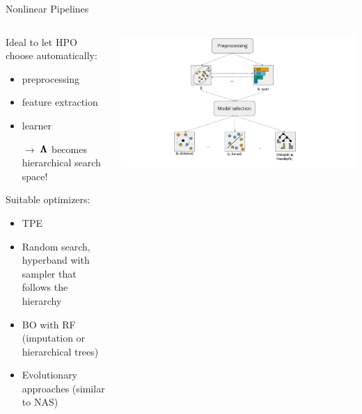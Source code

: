 	\begin{frame}{Nonlinear Pipelines}
		
		\begin{columns}
			\begin{column}{0.6\textwidth}
				Ideal to let HPO choose automatically:
				\begin{itemize}
					\item preprocessing
					\item feature extraction   
					\item learner
					\item[$\rightarrow$] $\pmb{\Lambda}$ becomes hierarchical search space!
				\end{itemize}
				
				\vspace*{0.5em}
				
				Suitable optimizers:
				\begin{itemize}
					\item TPE 
					\item Random search, hyperband with sampler that follows the hierarchy
					\item BO with RF (imputation or hierarchical trees) 
					\item Evolutionary approaches (similar to NAS)
				\end{itemize}
				
			\end{column}%
			\begin{column}{0.4\textwidth}
				\begin{center}
					\includegraphics[width = \textwidth, trim=160 0 160 5, clip]{images/dag.pdf}
				\end{center}
			\end{column}
		\end{columns}
	\end{frame}
	
